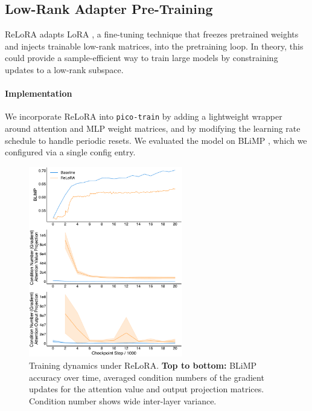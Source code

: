 \subsection{Low-Rank Adapter Pre-Training}

ReLoRA \citep{lialin2023relora} adapts LoRA \citep{hu2021lora}, a fine-tuning technique that freezes pretrained weights and injects trainable low-rank matrices, into the pretraining loop. In theory, this could provide a sample-efficient way to train large models by constraining updates to a low-rank subspace. %

\paragraph{Implementation} We incorporate ReLoRA into \texttt{pico-train} by adding a lightweight wrapper around attention and MLP weight matrices, and by modifying the learning rate schedule to handle periodic resets. We evaluated the model on BLiMP \citep{warstadt2020blimp}, which we configured via a single config entry. %

\begin{figure}[h!]
    \centering
    \includegraphics[width=0.6\textwidth]{chapters/pico/figures/relora-example.pdf}
    \caption{Training dynamics under ReLoRA.
    \textbf{Top to bottom:} BLiMP accuracy over time, averaged condition numbers of the gradient updates for the attention value and output projection matrices. Condition number shows wide inter-layer variance.
    }
    \label{fig:relora_example}
\end{figure}

